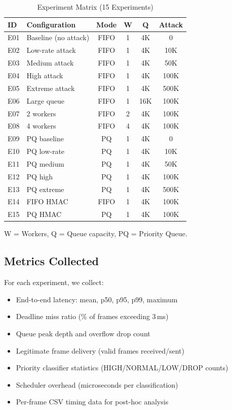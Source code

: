 \documentclass{ieeeaccess}
\begin{document}
\begin{table}[t]
\caption{Experiment Matrix (15 Experiments)}
\label{tab:experiments}
\centering
\small
\begin{tabular}{llcccc}
\toprule
\textbf{ID} & \textbf{Configuration} & \textbf{Mode} & \textbf{W} & \textbf{Q} & \textbf{Attack} \\
\midrule
E01 & Baseline (no attack) & FIFO & 1 & 4K & 0 \\
E02 & Low-rate attack & FIFO & 1 & 4K & 10K \\
E03 & Medium attack & FIFO & 1 & 4K & 50K \\
E04 & High attack & FIFO & 1 & 4K & 100K \\
E05 & Extreme attack & FIFO & 1 & 4K & 500K \\
\midrule
E06 & Large queue & FIFO & 1 & 16K & 100K \\
\midrule
E07 & 2 workers & FIFO & 2 & 4K & 100K \\
E08 & 4 workers & FIFO & 4 & 4K & 100K \\
\midrule
E09 & PQ baseline & PQ & 1 & 4K & 0 \\
E10 & PQ low-rate & PQ & 1 & 4K & 10K \\
E11 & PQ medium & PQ & 1 & 4K & 50K \\
E12 & PQ high & PQ & 1 & 4K & 100K \\
E13 & PQ extreme & PQ & 1 & 4K & 500K \\
\midrule
E14 & FIFO HMAC & FIFO & 1 & 4K & 100K \\
E15 & PQ HMAC & PQ & 1 & 4K & 100K \\
\bottomrule
\end{tabular}
\vspace{1mm}
\small{W = Workers, Q = Queue capacity, PQ = Priority Queue.}
\end{table}

\subsection{Metrics Collected}
For each experiment, we collect:
\begin{itemize}[leftmargin=*]
    \item End-to-end latency: mean, p50, p95, p99, maximum
    \item Deadline miss ratio (\% of frames exceeding 3\,ms)
    \item Queue peak depth and overflow drop count
    \item Legitimate frame delivery (valid frames received/sent)
    \item Priority classifier statistics (HIGH/NORMAL/LOW/DROP counts)
    \item Scheduler overhead (microseconds per classification)
    \item Per-frame CSV timing data for post-hoc analysis
\end{itemize}
\end{document}
